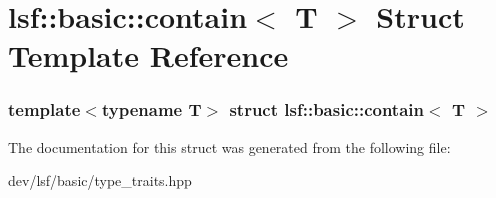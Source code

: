 \hypertarget{structlsf_1_1basic_1_1contain_3_01T_01_4}{
\section{lsf::basic::contain$<$ T $>$ Struct Template Reference}
\label{structlsf_1_1basic_1_1contain_3_01T_01_4}
}
\subsubsection*{template$<$typename T$>$ struct lsf::basic::contain$<$ T $>$}



The documentation for this struct was generated from the following file:\begin{DoxyCompactItemize}
\item 
dev/lsf/basic/type\_\-traits.hpp\end{DoxyCompactItemize}
